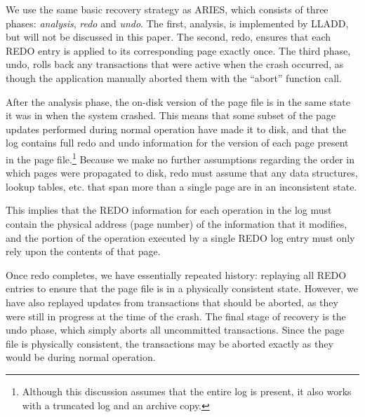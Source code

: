 \documentclass[10pt,letterpaper,twocolumn,english]{article}
\newcommand{\yad}{LLADD\xspace}
\begin{document}
%

We use the same basic recovery strategy as ARIES, which consists of
three phases: {\em analysis}, {\em redo} and {\em undo}.  The first,
analysis, is implemented by \yad, but will not be discussed in this
paper. The second, redo, ensures that each REDO entry is applied to
its corresponding page exactly once.  The third phase, undo, rolls
back any transactions that were active when the crash occurred, as
though the application manually aborted them with the ``abort''
function call.
  
After the analysis phase, the on-disk version of the page file is in
the same state it was in when the system crashed. This means that some
subset of the page updates performed during normal operation have made
it to disk, and that the log contains full redo and undo information
for the version of each page present in the page
file.\footnote{Although this discussion assumes that the entire log is
present, it also works with a truncated log and an archive copy.}
Because we make no further assumptions regarding the order in which
pages were propagated to disk, redo must assume that any data
structures, lookup tables, etc. that span more than a single page are
in an inconsistent state. 

This implies that the REDO information for each operation in the log
must contain the physical address (page number) of the information
that it modifies, and the portion of the operation executed by a
single REDO log entry must only rely upon the contents of that
page.

Once redo completes, we have essentially repeated history: replaying
all REDO entries to ensure that the page file is in a physically
consistent state.  However, we have also replayed updates from transactions
that should be aborted, as they were still in progress at the time of
the crash.  The final stage of recovery is the undo phase, which simply
aborts all uncommitted transactions. Since the page file is physically
consistent, the transactions may be aborted exactly as they would be
during normal operation.
\end{document}
